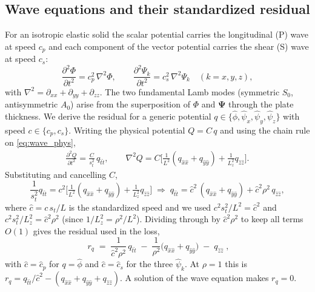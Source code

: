 \documentclass[11pt]{article}
\newcommand{\xh}{\hat{x}} \newcommand{\yh}{\hat{y}} \newcommand{\zh}{\hat{z}}
\newcommand{\tht}{\hat{t}}
\newcommand{\phih}{\hat{\phi}} \newcommand{\psih}{\hat{\psi}}
\newcommand{\cph}{\hat{c}_p} \newcommand{\csh}{\hat{c}_s}
\newcommand{\ddd}[2]{\frac{\partial^2 #1}{\partial #2^2}}
\begin{document}
\subsection{Wave equations and their standardized residual}
For an isotropic elastic solid the scalar potential carries the longitudinal (P)
wave at speed $c_p$ and each component of the vector potential carries the shear
(S) wave at speed $c_s$:
\begin{equation}
\ddd{\Phi}{t}=c_p^2\,\nabla^2\Phi,\qquad
\ddd{\Psi_k}{t}=c_s^2\,\nabla^2\Psi_k\quad(k=x,y,z),
\label{eq:wave_phys}
\end{equation}
with $\nabla^2=\partial_{xx}+\partial_{yy}+\partial_{zz}$. The two fundamental
Lamb modes (symmetric $S_0$, antisymmetric $A_0$) arise from the superposition of
$\Phi$ and $\boldsymbol{\Psi}$ through the plate thickness. We derive the
residual for a generic potential $q\in\{\phih,\psih_x,\psih_y,\psih_z\}$ with
speed $c\in\{c_p,c_s\}$. Writing the physical potential $Q=C\,q$ and using the
chain rule on \eqref{eq:wave_phys},
\begin{align}
\ddd{Q}{t}=\frac{C}{s_t^2}\,q_{\tht\tht},\qquad
\nabla^2 Q = C\Big[\tfrac{1}{L^2}(q_{\xh\xh}+q_{\yh\yh})+\tfrac{1}{L_z^2}q_{\zh\zh}\Big].
\end{align}
Substituting and cancelling $C$,
\begin{equation}
\frac{1}{s_t^2}q_{\tht\tht}
= c^2\Big[\tfrac{1}{L^2}(q_{\xh\xh}+q_{\yh\yh})+\tfrac{1}{L_z^2}q_{\zh\zh}\Big]
\;\Longrightarrow\;
q_{\tht\tht}=\hat c^2\,(q_{\xh\xh}+q_{\yh\yh})+\hat c^2\rho^2\,q_{\zh\zh},
\end{equation}
where $\hat c=c\,s_t/L$ is the standardized speed and we used
$c^2 s_t^2/L^2=\hat c^2$ and $c^2 s_t^2/L_z^2=\hat c^2\rho^2$ (since
$1/L_z^2=\rho^2/L^2$). Dividing through by $\hat c^2\rho^2$ to keep all terms
$O(1)$ gives the residual used in the loss,
\begin{equation}
\boxed{\;
r_q \;=\; \frac{1}{\hat c^2\rho^2}\,q_{\tht\tht}
\;-\;\frac{1}{\rho^2}\big(q_{\xh\xh}+q_{\yh\yh}\big)\;-\;q_{\zh\zh}\;,}
\label{eq:res}
\end{equation}
with $\hat c=\cph$ for $q=\phih$ and $\hat c=\csh$ for the three
$\psih_k$. At $\rho=1$ this is $r_q=q_{\tht\tht}/\hat c^2-(q_{\xh\xh}+q_{\yh\yh}+q_{\zh\zh})$.
A solution of the wave equation makes $r_q=0$.
\end{document}
